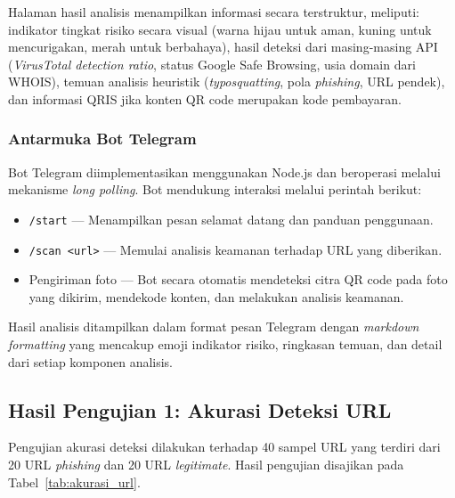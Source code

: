 \documentclass[conference]{IEEEtran}
\begin{document}
Halaman hasil analisis menampilkan informasi secara terstruktur, meliputi: indikator tingkat risiko secara visual (warna hijau untuk aman, kuning untuk mencurigakan, merah untuk berbahaya), hasil deteksi dari masing-masing API (\textit{VirusTotal detection ratio}, status Google Safe Browsing, usia domain dari WHOIS), temuan analisis heuristik (\textit{typosquatting}, pola \textit{phishing}, URL pendek), dan informasi QRIS jika konten QR code merupakan kode pembayaran.

\subsubsection{Antarmuka Bot Telegram}
Bot Telegram diimplementasikan menggunakan Node.js dan beroperasi melalui mekanisme \textit{long polling}. Bot mendukung interaksi melalui perintah berikut:
\begin{itemize}
    \item \texttt{/start} --- Menampilkan pesan selamat datang dan panduan penggunaan.
    \item \texttt{/scan <url>} --- Memulai analisis keamanan terhadap URL yang diberikan.
    \item Pengiriman foto --- Bot secara otomatis mendeteksi citra QR code pada foto yang dikirim, mendekode konten, dan melakukan analisis keamanan.
\end{itemize}

Hasil analisis ditampilkan dalam format pesan Telegram dengan \textit{markdown formatting} yang mencakup emoji indikator risiko, ringkasan temuan, dan detail dari setiap komponen analisis.

\subsection{Hasil Pengujian 1: Akurasi Deteksi URL}

Pengujian akurasi deteksi dilakukan terhadap 40 sampel URL yang terdiri dari 20 URL \textit{phishing} dan 20 URL \textit{legitimate}. Hasil pengujian disajikan pada Tabel~\ref{tab:akurasi_url}.
\end{document}
